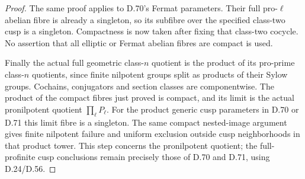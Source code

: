 \begin{proof}
The same proof applies to D.70's
Fermat parameters. Their full
pro-\(\ell\) abelian fibre is
already a singleton, so its
subfibre over the specified
class-two cusp is a singleton.
Compactness is now taken after
fixing that class-two cocycle.
No assertion that all elliptic
or Fermat abelian fibres are
compact is used.

Finally the actual full geometric
class-\(n\) quotient is the product
of its pro-prime class-\(n\)
quotients, since finite nilpotent
groups split as products of their
Sylow groups. Cochains, conjugators
and section classes are componentwise.
The product of the compact fibres
just proved is compact, and its
limit is the actual pronilpotent
quotient \(\prod_\ell P_\ell\).
For the product generic cusp
parameters in D.70 or D.71 this
limit fibre is a singleton.
The same compact nested-image
argument gives finite nilpotent
failure and uniform exclusion
outside cusp neighborhoods in
that product tower. This step
concerns the pronilpotent quotient;
the full-profinite cusp conclusions
remain precisely those of D.70
and D.71, using D.24/D.56.
\end{proof}
